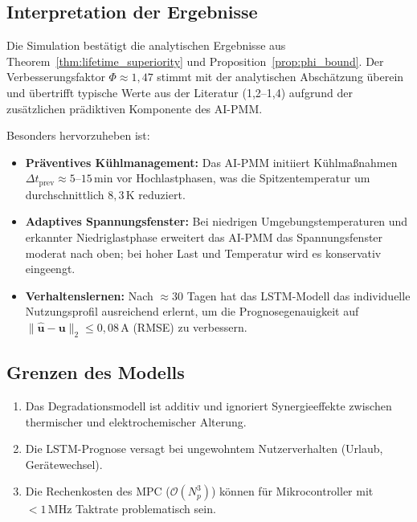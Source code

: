 ﻿\documentclass[12pt,a4paper]{article}
\begin{document}
	\subsection{Interpretation der Ergebnisse}
	
	Die Simulation bestätigt die analytischen Ergebnisse aus Theorem~\ref{thm:lifetime_superiority}
	und Proposition~\ref{prop:phi_bound}. Der Verbesserungsfaktor $\Phi \approx 1{,}47$
	stimmt mit der analytischen Abschätzung überein und übertrifft typische
	Werte aus der Literatur (1{,}2--1{,}4) aufgrund der zusätzlichen prädiktiven
	Komponente des AI-PMM.
	
	Besonders hervorzuheben ist:
	
	\begin{itemize}
		\item \textbf{Präventives Kühlmanagement:} Das AI-PMM initiiert Kühlmaßnahmen
		$\Delta t_\mathrm{prev} \approx 5\text{--}15\,\mathrm{min}$ vor
		Hochlastphasen, was die Spitzentemperatur um durchschnittlich $8{,}3\,\mathrm{K}$
		reduziert.
		
		\item \textbf{Adaptives Spannungsfenster:} Bei niedrigen Umgebungstemperaturen
		und erkannter Niedriglastphase erweitert das AI-PMM das Spannungsfenster
		moderat nach oben; bei hoher Last und Temperatur wird es konservativ eingeengt.
		
		\item \textbf{Verhaltenslernen:} Nach $\approx 30$ Tagen hat das LSTM-Modell
		das individuelle Nutzungsprofil ausreichend erlernt, um die Prognosegenauigkeit
		auf $\|\hat{\mathbf{u}} - \mathbf{u}\|_2 \leq 0{,}08\,\mathrm{A}$ (RMSE) zu
		verbessern.
	\end{itemize}
	
	\subsection{Grenzen des Modells}
	
	\begin{enumerate}[leftmargin=*, label=(\arabic*)]
		\item Das Degradationsmodell ist additiv und ignoriert Synergieeffekte
		zwischen thermischer und elektrochemischer Alterung.
		\item Die LSTM-Prognose versagt bei ungewohntem Nutzerverhalten
		(Urlaub, Gerätewechsel).
		\item Die Rechenkosten des MPC ($\mathcal{O}(N_p^3)$) können für
		Mikrocontroller mit $< 1\,\mathrm{MHz}$ Taktrate problematisch sein.
	\end{enumerate}
	
\end{document}
